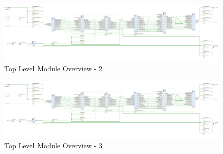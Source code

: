 \documentclass[a4paper]{report}
\begin{document}
\begin{landscape}
\begin{figure}[h!]
  \includegraphics*[viewport={950 0 1900 600}, height=\textwidth, width=2\textheight, keepaspectratio]{imgs/top-level-module.png}
  \caption{Top Level Module Overview - 2}
  \label{fig:top-level-design}
\end{figure}
\begin{figure}[h!]
  \ContinuedFloat
  \centering
  \includegraphics*[viewport={1900 0 2850 600}, height=\textwidth, width=2\textheight, keepaspectratio]{imgs/top-level-module.png}
  \caption{Top Level Module Overview - 3}
  \label{fig:top-level-design}
\end{figure}
\end{landscape}
\end{document}
